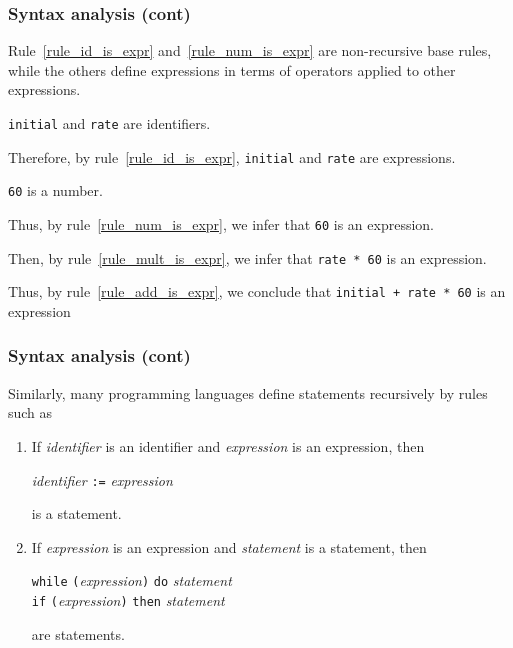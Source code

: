 % 
\begin{frame}[containsverbatim]
\frametitle{Syntax analysis (cont)}

Rule~\ref{rule_id_is_expr} and~\ref{rule_num_is_expr} are
non-recursive base rules, while the others define expressions in terms
of operators applied to other expressions.

\bigskip

\texttt{initial} and \texttt{rate} are identifiers.

\bigskip

Therefore, by rule~\ref{rule_id_is_expr}, \texttt{initial} and
\texttt{rate} are expressions. 

\bigskip

\texttt{60} is a number.

\bigskip

Thus, by rule~\ref{rule_num_is_expr}, we infer that \texttt{60} is an
expression.

\bigskip

Then, by rule~\ref{rule_mult_is_expr}, we infer that \verb|rate * 60|
is an expression.

\bigskip

Thus, by rule~\ref{rule_add_is_expr}, we conclude that
\verb|initial + rate * 60| is an expression

\end{frame}

% 
\begin{frame}[containsverbatim]
\frametitle{Syntax analysis (cont)}

Similarly, many programming languages define statements recursively
by rules such as
\begin{enumerate}

  \item If \emph{identifier} is an identifier and
    \emph{expression} is an expression, then 
    \begin{center}
      \emph{identifier} \verb|:=| \emph{expression}
    \end{center}
    is a statement.

  \item If \emph{expression} is an expression and \emph{statement} is
    a statement, then
    \begin{center}
       \texttt{while} \texttt{(}\emph{expression}\texttt{)}
       \texttt{do} \emph{statement}\\
       \texttt{if} \texttt{(}\emph{expression}\texttt{)} \texttt{then}
       \emph{statement}
    \end{center}
    are statements.
\end{enumerate}

\end{frame}

